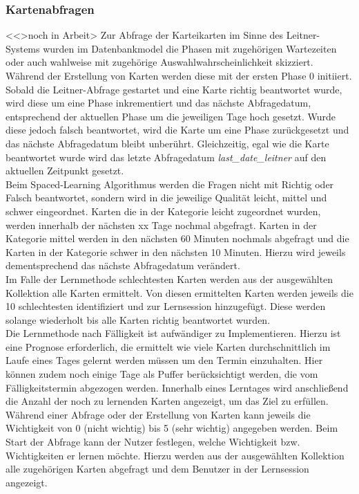 \subsubsection{Kartenabfragen}
<<>noch in Arbeit>
Zur Abfrage der Karteikarten im Sinne des Leitner-Systems wurden im Datenbankmodel die Phasen mit zugehörigen Wartezeiten oder auch wahlweise mit zugehörige Auswahlwahrscheinlichkeit skizziert. Während der Erstellung von Karten werden diese mit der ersten Phase 0 initiiert. Sobald die Leitner-Abfrage gestartet und eine Karte richtig beantwortet wurde, wird diese um eine Phase inkrementiert und das nächste Abfragedatum, entsprechend der aktuellen Phase um die jeweiligen Tage hoch gesetzt. Wurde diese jedoch falsch beantwortet, wird die Karte um eine Phase zurückgesetzt und das nächste Abfragedatum bleibt unberührt. Gleichzeitig, egal wie die Karte beantwortet wurde wird das letzte Abfragedatum \emph{last{\_}date{\_}leitner} auf den aktuellen Zeitpunkt gesetzt. \\

Beim Spaced-Learning Algorithmus werden die Fragen nicht mit Richtig oder Falsch beantwortet, sondern wird in die jeweilige Qualität leicht, mittel und schwer eingeordnet. Karten die in der Kategorie leicht zugeordnet wurden, werden innerhalb der nächsten xx Tage nochmal abgefragt. Karten in der Kategorie mittel werden in den nächsten 60 Minuten nochmals abgefragt und die Karten in der Kategorie schwer in den nächsten 10 Minuten. Hierzu wird jeweils dementsprechend das nächste Abfragedatum verändert. \\

Im Falle der Lernmethode \glqq{}schlechtesten Karten \grqq{} werden aus der ausgewählten Kollektion alle Karten ermittelt. Von diesen ermittelten Karten werden jeweils die 10 schlechtesten identifiziert und zur Lernsession hinzugefügt. Diese werden solange wiederholt bis alle Karten richtig beantwortet wurden. \\

Die Lernmethode nach Fälligkeit ist aufwändiger zu Implementieren. Hierzu ist eine Prognose erforderlich, die ermittelt wie viele Karten durchschnittlich im Laufe eines Tages gelernt werden müssen um den Termin einzuhalten. Hier können zudem noch einige Tage als Puffer berücksichtigt werden, die vom Fälligkeitstermin abgezogen werden. Innerhalb eines Lerntages wird anschließend die Anzahl der noch zu lernenden Karten angezeigt, um das Ziel zu erfüllen. \\

Während einer Abfrage oder der Erstellung von Karten kann jeweils die Wichtigkeit von 0 (nicht wichtig) bis 5 (sehr wichtig) angegeben werden. Beim Start der Abfrage kann der Nutzer festlegen, welche Wichtigkeit bzw. Wichtigkeiten er lernen möchte. Hierzu werden aus der ausgewählten Kollektion alle zugehörigen Karten abgefragt und dem Benutzer in der Lernsession angezeigt. \\

